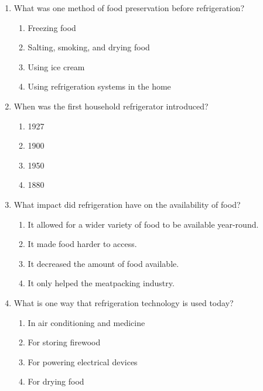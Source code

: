\documentclass[12pt]{article}
\begin{document}
\begin{enumerate}
    \item What was one method of food preservation before refrigeration?
    \begin{enumerate}[label=\Alph*.]
        \item Freezing food
        \item Salting, smoking, and drying food
        \item Using ice cream
        \item Using refrigeration systems in the home
    \end{enumerate}
    \vspace{0.5cm}

    \item When was the first household refrigerator introduced?
    \begin{enumerate}[label=\Alph*.]
        \item 1927
        \item 1900
        \item 1950
        \item 1880
    \end{enumerate}
    \vspace{0.5cm}

    \item What impact did refrigeration have on the availability of food?
    \begin{enumerate}[label=\Alph*.]
        \item It allowed for a wider variety of food to be available year-round.
        \item It made food harder to access.
        \item It decreased the amount of food available.
        \item It only helped the meatpacking industry.
    \end{enumerate}
    \vspace{0.5cm}

    \item What is one way that refrigeration technology is used today?
    \begin{enumerate}[label=\Alph*.]
        \item In air conditioning and medicine
        \item For storing firewood
        \item For powering electrical devices
        \item For drying food
    \end{enumerate}
    \vspace{0.5cm}


\end{enumerate}
\end{document}

